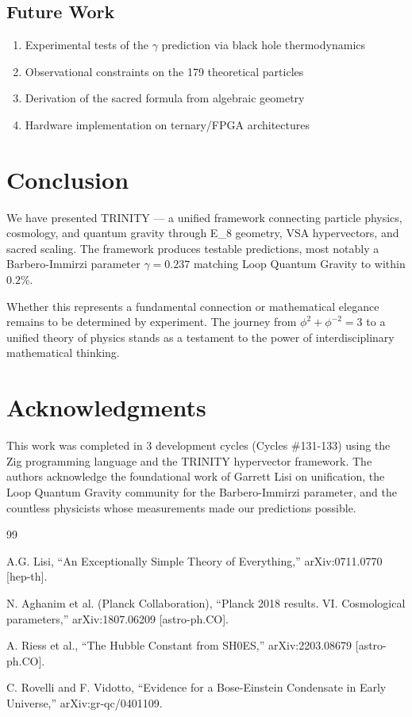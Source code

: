 \documentclass[12pt,a4paper]{article}
\newcommand{\TRINITY}{{\rm TRINITY}}
\newcommand{\EIGHT}{{\rm E}_8}
\begin{document}
\subsection{Future Work}

\begin{enumerate}
\item Experimental tests of the $\gamma$ prediction via black hole thermodynamics
\item Observational constraints on the 179 theoretical particles
\item Derivation of the sacred formula from algebraic geometry
\item Hardware implementation on ternary/FPGA architectures
\end{enumerate}

\section{Conclusion}

We have presented \TRINITY{} — a unified framework connecting particle physics, cosmology, and quantum gravity through \EIGHT{} geometry, VSA hypervectors, and sacred scaling. The framework produces testable predictions, most notably a Barbero-Immirzi parameter $\gamma = 0.237$ matching Loop Quantum Gravity to within $0.2\%$.

Whether this represents a fundamental connection or mathematical elegance remains to be determined by experiment. The journey from $\phi^2 + \phi^{-2} = 3$ to a unified theory of physics stands as a testament to the power of interdisciplinary mathematical thinking.

\section*{Acknowledgments}

This work was completed in 3 development cycles (Cycles \#131-133) using the Zig programming language and the \TRINITY{} hypervector framework. The authors acknowledge the foundational work of Garrett Lisi on \Eeight{} unification, the Loop Quantum Gravity community for the Barbero-Immirzi parameter, and the countless physicists whose measurements made our predictions possible.

\begin{thebibliography}{99}

 A.G. Lisi, ``An Exceptionally Simple Theory of Everything,'' arXiv:0711.0770 [hep-th].

 N. Aghanim et al. (Planck Collaboration), ``Planck 2018 results. VI. Cosmological parameters,'' arXiv:1807.06209 [astro-ph.CO].

 A. Riess et al., ``The Hubble Constant from SH0ES,'' arXiv:2203.08679 [astro-ph.CO].

 C. Rovelli and F. Vidotto, ``Evidence for a Bose-Einstein Condensate in Early Universe,'' arXiv:gr-qc/0401109.

\end{thebibliography}
\end{document}
